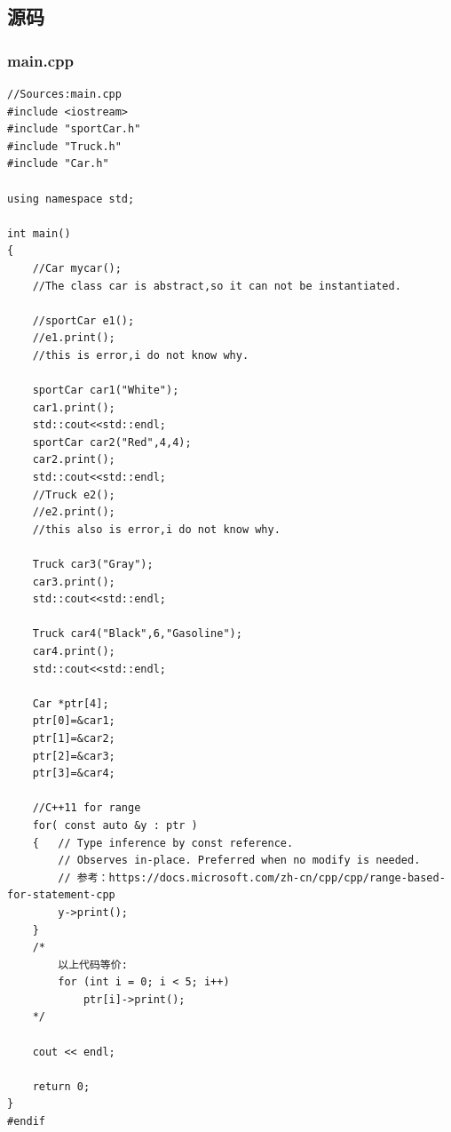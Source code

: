 \documentclass[UTF8,18pt]{ctexart}
\begin{document}
\subsection{源码}

\subsubsection{main.cpp}
\begin{verbatim}
//Sources:main.cpp
#include <iostream>
#include "sportCar.h"
#include "Truck.h"
#include "Car.h"

using namespace std;

int main()
{
    //Car mycar();
    //The class car is abstract,so it can not be instantiated.

    //sportCar e1();
    //e1.print();
    //this is error,i do not know why.

    sportCar car1("White");
    car1.print();
    std::cout<<std::endl;
    sportCar car2("Red",4,4);
    car2.print();
    std::cout<<std::endl;
    //Truck e2();
    //e2.print();
    //this also is error,i do not know why.

    Truck car3("Gray");
    car3.print();
    std::cout<<std::endl;

    Truck car4("Black",6,"Gasoline");
    car4.print();
    std::cout<<std::endl;

    Car *ptr[4];
    ptr[0]=&car1;
    ptr[1]=&car2;
    ptr[2]=&car3;
    ptr[3]=&car4;

    //C++11 for range
    for( const auto &y : ptr )
    {   // Type inference by const reference.
        // Observes in-place. Preferred when no modify is needed.
        // 参考：https://docs.microsoft.com/zh-cn/cpp/cpp/range-based-for-statement-cpp
        y->print();
    }
    /*
        以上代码等价:
        for (int i = 0; i < 5; i++)
            ptr[i]->print();
    */

    cout << endl;

    return 0;
}
#endif
\end{verbatim}
\end{document}
